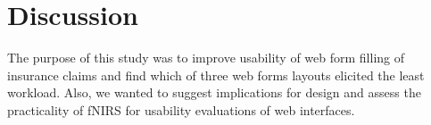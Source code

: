 \documentclass[../main/Replicate.tex]{subfiles}
\begin{document}
\section{Discussion}
	The purpose of this study was to improve usability of web form filling of insurance claims and find which of three web forms layouts elicited the least workload. Also, we wanted to suggest implications for design and assess the practicality of fNIRS for usability evaluations of web interfaces.
%	
\end{document}

